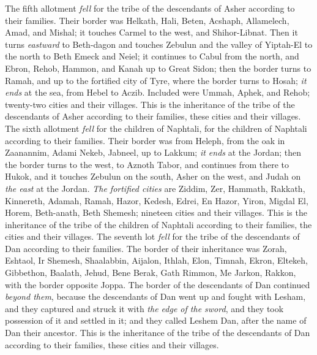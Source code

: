 \begin{biblechapter}
 The fifth allotment \textit{fell} for the tribe of the descendants of Asher according to their families.
\verse Their border was Helkath, Hali, Beten, Acshaph,
\verse Allamelech, Amad, and Mishal; it touches Carmel to the west, and Shihor-Libnat.
\verse Then it turns \textit{eastward} to Beth-dagon and touches Zebulun and the valley of Yiptah-El to the north to Beth Emeck and Neiel; it continues to Cabul from the north,
\verse and Ebron, Rehob, Hammon, and Kanah up to Great Sidon;
\verse then the border turns to Ramah, and up to the fortified city of Tyre, where the border turns to Hosah; \textit{it ends} at the sea, from Hebel to Aczib.
\verse Included were Ummah, Aphek, and Rehob; twenty-two cities and their villages.
\verse This is the inheritance of the tribe of the descendants of Asher according to their families, these cities and their villages.
 The sixth allotment \textit{fell} for the children of Naphtali, for the children of Naphtali according to their families.
\verse Their border was from Heleph, from the oak in Zaanannim, Adami Nekeb, Jabneel, up to Lakkum; \textit{it ends} at the Jordan;
\verse then the border turns to the west, to Aznoth Tabor, and continues from there to Hukok, and it touches Zebulun on the south, Asher on the west, and Judah on \textit{the east} at the Jordan.
\verse \textit{The fortified cities} are Ziddim, Zer, Hammath, Rakkath, Kinnereth,
\verse Adamah, Ramah, Hazor,
\verse Kedesh, Edrei, En Hazor,
\verse Yiron, Migdal El, Horem, Beth-anath, Beth Shemesh; nineteen cities and their villages.
\verse This is the inheritance of the tribe of the children of Naphtali according to their families, the cities and their villages.
 The seventh lot \textit{fell} for the tribe of the descendants of Dan according to their families.
\verse The border of their inheritance was Zorah, Eshtaol, Ir Shemesh,
\verse Shaalabbin, Aijalon, Ithlah,
\verse Elon, Timnah, Ekron,
\verse Eltekeh, Gibbethon, Baalath,
\verse Jehud, Bene Berak, Gath Rimmon,
\verse Me Jarkon, Rakkon, with the border opposite Joppa.
\verse The border of the descendants of Dan continued \textit{beyond them}, because the descendants of Dan went up and fought with Lesham, and they captured and struck it with \textit{the edge of the sword}, and they took possession of it and settled in it; and they called Leshem Dan, after the name of Dan their ancestor.
\verse This is the inheritance of the tribe of the descendants of Dan according to their families, these cities and their villages.

\end{biblechapter}
